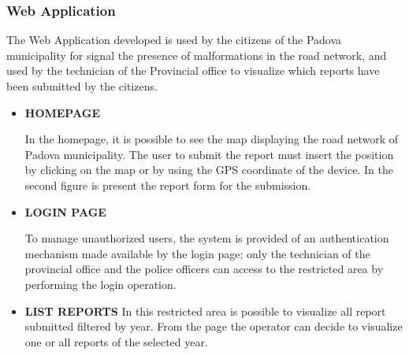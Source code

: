  \subsubsection{Web Application}
 The Web Application developed is used by the citizens of the Padova municipality for signal the presence of malformations in the road network, and used by the technician of the Provincial office to visualize which reports have been submitted by the citizens. 
 \begin{itemize}
    \newpage
     \item \textbf{HOMEPAGE}

 In the homepage, it is possible to see the map displaying the road network of Padova municipality.
 The user to submit the report must insert the position by clicking on the map or by using the GPS coordinate of the device.
 In the second figure is present the report form for the submission.

    \item \textbf{LOGIN PAGE}
    
    To manage unauthorized users, the system is provided of an authentication mechanism made available by the login page; only the technician of the provincial office and the police officers can access to the restricted area by performing the login operation.

    \item \textbf{LIST REPORTS}
    In this restricted area is possible to visualize all report submitted filtered by year. From the page the operator can decide to visualize one or all reports of the selected year.


\end{itemize}
